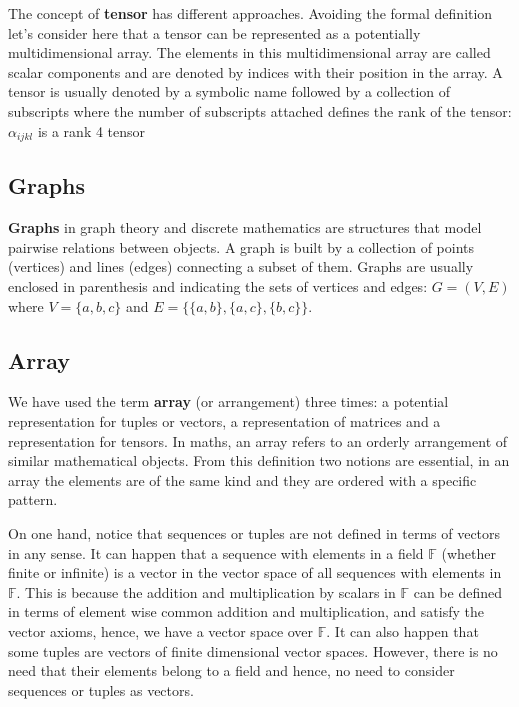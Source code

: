 The concept of \textbf{tensor} has different approaches. 
Avoiding the formal definition let's consider here that a tensor can be represented as a potentially multidimensional array.
The elements in this multidimensional array are called scalar components and are denoted by indices with their position in the array.
A tensor is usually denoted by a symbolic name followed by a collection of subscripts where the number of subscripts attached defines the rank of the tensor: $\alpha_{ijkl}$ is a rank 4 tensor


        \subsection*{Graphs}
\textbf{Graphs} in graph theory and discrete mathematics are structures that model pairwise relations between objects. 
A graph is built by a collection of points (vertices) and lines (edges) connecting a subset of them.
Graphs are usually enclosed in parenthesis and indicating the sets of vertices and edges: $G = (V,E)$ where $V = \{a,b,c\}$ and $E = \{\{a,b\},\{a,c\},\{b,c\}\}$. 


        \subsection*{Array}

We have used the term \textbf{array} (or arrangement) three times: 
a potential representation for tuples or vectors, 
a representation of matrices and a representation for tensors. 
In maths, an array refers to an orderly arrangement of similar 
mathematical objects. From this definition two notions are essential, 
in an array the elements are of the same kind and they are ordered with a specific pattern.

On one hand, notice that sequences or tuples are not defined in terms of vectors in any sense. 
It can happen that a sequence with elements in a field $\mathbb{F}$ 
(whether finite or infinite)
is a vector in the vector space of all sequences with elements in $\mathbb{F}$.
This is because the addition and multiplication by scalars in $\mathbb{F}$ 
can be defined in terms of element wise common addition and multiplication, 
and satisfy the vector axioms, hence, we have a vector space over $\mathbb{F}$. 
It can also happen that some tuples are vectors of finite dimensional vector spaces. 
However, there is no need that their elements belong to a field and hence, no need 
to consider sequences or tuples  as vectors. 

